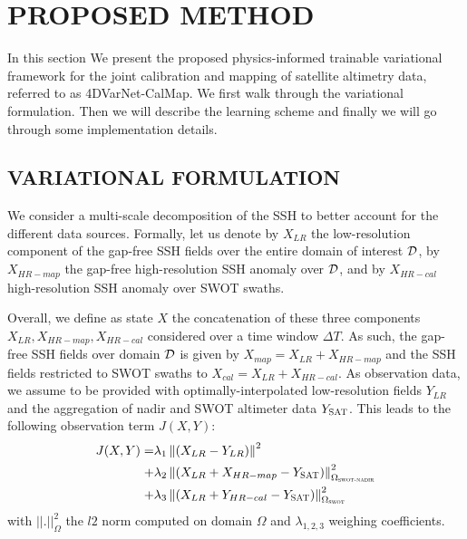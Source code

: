 \documentclass{article}
\begin{document}

\section{PROPOSED METHOD}

In this section We present the proposed physics-informed trainable variational framework for the joint calibration and mapping of satellite altimetry data,  referred to as 4DVarNet-CalMap.
We first walk through the variational formulation.
Then we will describe the learning scheme and finally we will go through some implementation details.


\subsection{VARIATIONAL FORMULATION}
We consider a multi-scale decomposition of the SSH to better account for the different data sources. Formally, let us denote by $X_{LR}$ the low-resolution component of the gap-free SSH fields over the entire domain of interest ${\cal{D}}$, by $X_{HR-map}$ the gap-free high-resolution SSH anomaly over ${\cal{D}}$, and by $X_{HR-cal}$ high-resolution SSH anomaly over SWOT swaths. %

Overall, we define as state $X$ the concatenation of these three components $X_{LR}, X_{HR-map}, X_{HR-cal}$ considered over a time window $\Delta T$. As such, the gap-free SSH fields over domain ${\cal{D}}$ is given by $ X_{map} = X_{LR} + X_{HR-map}$ and the  SSH fields restricted to SWOT swaths to $X_{cal} = X_{LR} + X_{HR-cal}$. As observation data, we assume to be provided with optimally-interpolated low-resolution fields $Y_{LR}$ and the aggregation of nadir and SWOT altimeter data $Y_{\textsc{SAT}}$. This leads to the following observation term $J(X,Y)$:
\begin{equation}
	\begin{split}
		J(X, Y) = & \lambda_1\left \|(X_{LR} - Y_{LR}) \right \|^2\\
	+ & \lambda_2\left \| (X_{LR} + X_{HR-map} - Y_{\textsc{SAT}})\right \|^2_{\Omega_{\textsc{swot-nadir}}} \\
	+ & \lambda_3\left \| (X_{LR} + Y_{HR-cal} - Y_{\textsc{SAT}})\right \|^2_{\Omega_{\textsc{swot}}} 
	\end{split}
\label{eqn:calmapcost}
\end{equation}
with $||.||^2_{\Omega}$ the $l2$ norm computed on domain $\Omega$ and $\lambda_{1,2,3}$ weighing coefficients.
\end{document}
